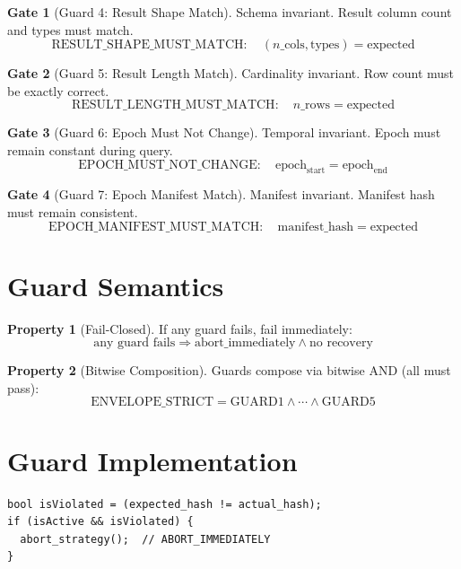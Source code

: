 \documentclass[12pt,oneside,a4paper]{book}
\theoremstyle{definition}
\newtheorem{property}{Property}[chapter]
\newtheorem{gate}{Gate}[chapter]
\begin{document}
\begin{gate}[Guard 4: Result Shape Match]
Schema invariant. Result column count and types must match.
$$\text{RESULT\_SHAPE\_MUST\_MATCH}: \quad (n\_\text{cols}, \text{types}) = \text{expected}$$
\end{gate}

\begin{gate}[Guard 5: Result Length Match]
Cardinality invariant. Row count must be exactly correct.
$$\text{RESULT\_LENGTH\_MUST\_MATCH}: \quad n\_\text{rows} = \text{expected}$$
\end{gate}

\begin{gate}[Guard 6: Epoch Must Not Change]
Temporal invariant. Epoch must remain constant during query.
$$\text{EPOCH\_MUST\_NOT\_CHANGE}: \quad \text{epoch}_\text{start} = \text{epoch}_\text{end}$$
\end{gate}

\begin{gate}[Guard 7: Epoch Manifest Match]
Manifest invariant. Manifest hash must remain consistent.
$$\text{EPOCH\_MANIFEST\_MUST\_MATCH}: \quad \text{manifest\_hash} = \text{expected}$$
\end{gate}

\section{Guard Semantics}
\label{sec:guard-semantics}

\begin{property}[Fail-Closed]
If any guard fails, fail immediately:
$$\text{any guard fails} \Rightarrow \text{abort\_immediately} \land \text{no recovery}$$
\end{property}

\begin{property}[Bitwise Composition]
Guards compose via bitwise AND (all must pass):
$$\text{ENVELOPE\_STRICT} = \text{GUARD1} \land \cdots \land \text{GUARD5}$$
\end{property}

\section{Guard Implementation}
\label{sec:guard-implementation}

\begin{lstlisting}
bool isViolated = (expected_hash != actual_hash);
if (isActive && isViolated) {
  abort_strategy();  // ABORT_IMMEDIATELY
}
\end{lstlisting}
\end{document}

